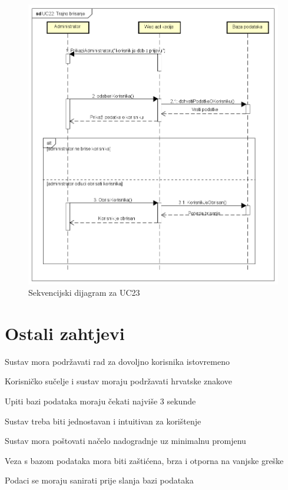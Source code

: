 				\begin{figure}[H]
					\includegraphics[scale=0.5]{slike/Uc22.PNG} %
					\centering
					\caption{Sekvencijski dijagram za UC23}
				\end{figure}
				
				
				\eject
	
		\section{Ostali zahtjevi}
				\begin{packed_item}
					\item Sustav mora podržavati rad za dovoljno korisnika istovremeno
					\item Korisničko sučelje i sustav moraju podržavati hrvatske znakove
					\item Upiti bazi podataka moraju čekati najviše 3 sekunde
					\item Sustav treba biti jednostavan i intuitivan za korištenje
					\item Sustav mora poštovati načelo nadogradnje uz minimalnu promjenu
					\item Veza s bazom podataka mora biti zaštićena, brza i otporna na vanjske greške
					\item Podaci se moraju sanirati prije slanja bazi podataka
				\end{packed_item}
			 
			 
			 
	